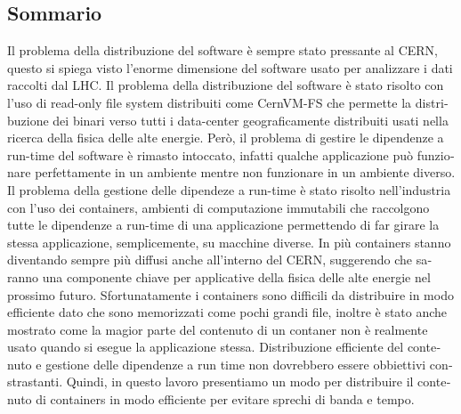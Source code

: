 \begin{otherlanguage}{italian}
\chapter*{Sommario}

Il problema della distribuzione del software è sempre stato pressante al CERN,
        questo si spiega visto l'enorme dimensione del software usato per
        analizzare i dati raccolti dal LHC. Il problema della distribuzione del
        software è stato risolto con l'uso di read-only file system distribuiti
        come CernVM-FS che permette la distribuzione dei binari verso tutti i
        data-center geograficamente distribuiti usati nella ricerca della
        fisica delle alte energie. Però, il problema di gestire le dipendenze a
        run-time del software è rimasto intoccato, infatti qualche applicazione
        può funzionare perfettamente in un ambiente mentre non funzionare in un
        ambiente diverso. Il problema della gestione delle dipendeze a run-time
        è stato risolto nell'industria con l'uso dei containers, ambienti di
        computazione immutabili che raccolgono tutte le dipendenze a run-time
        di una applicazione permettendo di far girare la stessa applicazione,
        semplicemente, su macchine diverse. In più containers stanno diventando
        sempre più diffusi anche all'interno del CERN, suggerendo che saranno
        una componente chiave per applicative della fisica delle alte energie
        nel prossimo futuro. Sfortunatamente i containers sono difficili da
        distribuire in modo efficiente dato che sono memorizzati come pochi
        grandi file, inoltre è stato anche mostrato come la magior parte del
        contenuto di un contaner non è realmente usato quando si esegue la
        applicazione stessa. Distribuzione efficiente del contenuto e gestione
        delle dipendenze a run time non dovrebbero essere obbiettivi
        constrastanti. Quindi, in questo lavoro presentiamo un modo per
        distribuire il contenuto di containers in modo efficiente per evitare
        sprechi di banda e tempo.

\end{otherlanguage}

\endgroup

\vfill

